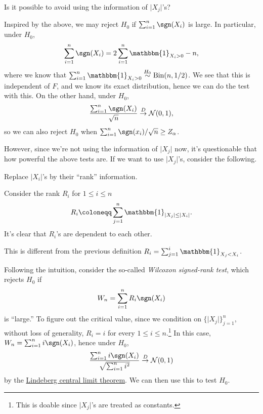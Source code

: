 \begin{problem*}
	Is it possible to avoid using the information of \(\vert X_j \vert \)'s?
\end{problem*}
\begin{answer}
	Inspired by the above, we may reject \(H_0\) if \(\sum_{i=1}^{n} \sgn (X_i) \) is large. In particular, under \(H_0\),
	\[
		\sum_{i=1}^{n} \sgn (X_i)
		= 2 \sum_{i=1}^{n} \mathbbm{1}_{X_i > 0} - n,
	\]
	where we know that \(\sum_{i=1}^{n} \mathbbm{1}_{X_i > 0} \overset{H_0}{\sim} \operatorname{Bin}(n, 1 / 2)\). We see that this is independent of \(F\), and we know its exact distribution, hence we can do the test with this. On the other hand, under \(H_0\),
	\[
		\frac{\sum_{i=1}^{n} \sgn (X_i)}{\sqrt{n} } \overset{D}{\to} \mathcal{N} (0, 1),
	\]
	so we can also reject \(H_0\) when \(\sum_{i=1}^{n} \sgn (x_i) / \sqrt{n} \geq Z_\alpha \).
\end{answer}

However, since we're not using the information of \(\vert X_j \vert \) now, it's questionable that how powerful the above tests are. If we want to use \(\vert X_j \vert \)'s, consider the following.

\begin{intuition}
	Replace \(\vert X_i \vert \)'s by their ``rank'' information.
\end{intuition}

Consider the rank \(R_i\) for \(1 \leq i \leq n\)
\[
	R_i
	\coloneqq \sum_{j=1}^{n} \mathbbm{1}_{\vert X_j \vert \leq \vert X_i \vert }.
\]
It's clear that \(R_i\)'s are dependent to each other.

\begin{prev}
	This is different from the previous definition \(R_i = \sum_{j=1}^{i} \mathbbm{1}_{X_j < X_i} \).
\end{prev}

Following the intuition, consider the so-called \emph{Wilcoxon signed-rank test}, which rejects \(H_0\) if
\[
	W_n = \sum_{i=1}^{n} R_i \sgn (X_i)
\]
is ``large.'' To figure out the critical value, since we condition on \(\{ \vert X_j \vert \}_{j = 1}^n \), without loss of generality, \(R_i = i\) for every \(1 \leq i \leq n\).\footnote{This is doable since \(\vert X_j \vert \)'s are treated as constants.} In this case, \(W_n = \sum_{i=1}^{n} i \sgn (X_i)\), hence under \(H_0\),
\[
	\frac{\sum_{i=1}^{n} i \sgn (X_i)}{\sqrt{\sum_{i=1}^{n} i^2} }
	\overset{D}{\to} \mathcal{N} (0, 1)
\]
by the \hyperref[thm:Lindeberg-CLT]{Lindeberg central limit theorem}. We can then use this to test \(H_0\).

